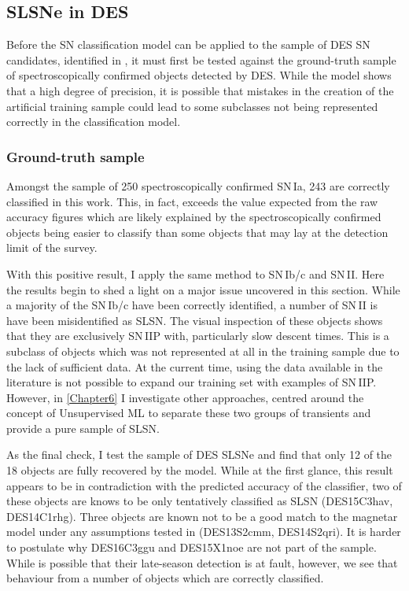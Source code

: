 \subsection{SLSNe in DES}
Before the SN classification model can be applied to the sample of DES SN candidates, identified in , it must first be tested against the ground-truth sample of spectroscopically confirmed objects detected by DES. While the model shows that a high degree of precision, it is possible that mistakes in the creation of the artificial training sample could lead to some subclasses not being represented correctly in the classification model.

\subsubsection{Ground-truth sample} \label{sec:SNTruth}
Amongst the sample of 250 spectroscopically confirmed SN\,Ia, 243 are correctly classified in this work. This, in fact, exceeds the value expected from the raw accuracy figures which are likely explained by the spectroscopically confirmed objects being easier to classify than some objects that may lay at the detection limit of the survey.

With this positive result, I apply the same method to SN\,Ib/c and SN\,II. Here the results begin to shed a light on a major issue uncovered in this section. While a majority of the SN\,Ib/c have been correctly identified, a number of SN\,II is have been misidentified as SLSN. The visual inspection of these objects shows that they are exclusively SN\,IIP with, particularly slow descent times. This is a subclass of objects which was not represented at all in the training sample due to the lack of sufficient data. At the current time, using the data available in the literature is not possible to expand our training set with examples of SN\,IIP. However, in \cref{Chapter6} I investigate other approaches, centred around the concept of Unsupervised ML to separate these two groups of transients and provide a pure sample of SLSN.

As the final check, I test the sample of DES SLSNe and find that only 12 of the 18 objects are fully recovered by the model. While at the first glance, this result appears to be in contradiction with the predicted accuracy of the classifier, two of these objects are knows to be only tentatively classified as SLSN (DES15C3hav, DES14C1rhg). Three objects are known not to be a good match to the magnetar model under any assumptions tested in  (DES13S2cmm, DES14S2qri). It is harder to postulate why DES16C3ggu and DES15X1noe are not part of the sample. While is possible that their late-season detection is at fault, however, we see that behaviour from a number of objects which are correctly classified.

